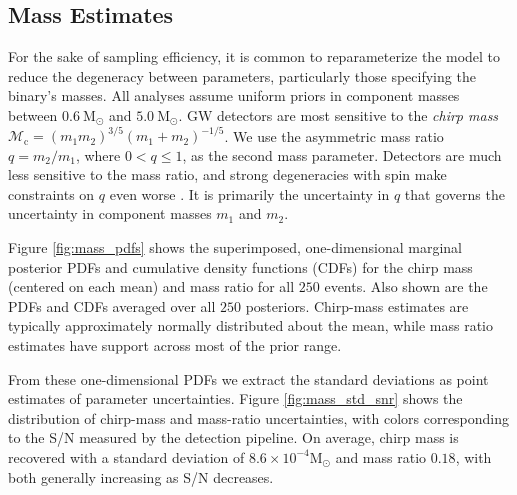 \subsection{Mass Estimates}\label{sec:mass}

For the sake of sampling efficiency, it is common to reparameterize the model to reduce the degeneracy between parameters, particularly those specifying the binary's masses.  All analyses assume uniform priors in component masses between $0.6~\mathrm{M}_\odot$ and $5.0~\mathrm{M}_\odot$.  GW detectors are most sensitive to the \emph{chirp mass} $\mathcal{M}_\mathrm{c} = (m_1 m_2)^{3/5} (m_1 + m_2)^{-1/5}$.  We use the asymmetric mass ratio $q = m_2/m_1$, where $0 < q \leq 1$, as the second mass parameter.  Detectors are much less sensitive to the mass ratio, and strong degeneracies with spin make constraints on $q$ even worse \citep{Cutler_1994}.  It is primarily the uncertainty in $q$ that governs the uncertainty in component masses $m_1$ and $m_2$.

Figure \ref{fig:mass_pdfs} shows the superimposed, one-dimensional marginal posterior PDFs and cumulative density functions (CDFs) for the chirp mass (centered on each mean) and mass ratio for all $250$ events.  Also shown are the PDFs and CDFs averaged over all $250$ posteriors. Chirp-mass estimates are typically approximately normally distributed about the mean, while mass ratio estimates have support across most of the prior range.

From these one-dimensional PDFs we extract the standard deviations as point estimates of parameter uncertainties.  Figure \ref{fig:mass_std_snr} shows the distribution of chirp-mass and mass-ratio uncertainties, with colors corresponding to the S/N measured by the detection pipeline. On average, chirp mass is recovered with a standard deviation of $8.6 \times 10^{-4} \mathrm{M}_\odot$ and mass ratio $0.18$, with both generally increasing as S/N decreases.